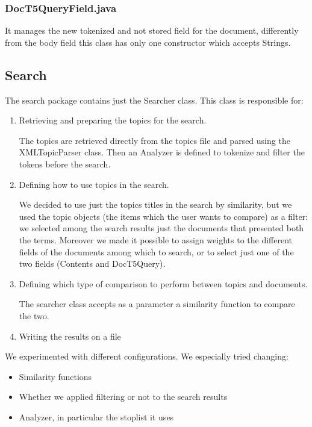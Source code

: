 \subsubsection{DocT5QueryField.java}
    
        It manages the new tokenized and not stored field for the document, differently from the body field this class has only one constructor which accepts Strings.
\subsection{Search}
  
  The search package contains just the Searcher class. This class is responsible for:
    \begin{enumerate}
    	\item Retrieving and preparing the topics for the search.
    	
    	The topics are retrieved directly from the topics file and parsed using the XMLTopicParser class.
    	Then an Analyzer is defined to tokenize and filter the tokens before the search.
    	\item Defining how to use topics in the search.
    	
    	We decided to use just the topics titles in the search by similarity, but we used the topic objects (the items which the user wants to compare) as a filter: we selected among the search results just the documents that presented both the terms.
    	Moreover we made it possible to assign weights to the different fields of the documents among which to search, or to select just one of the two fields (Contents and DocT5Query).
    	\item Defining which type of comparison to perform between topics and documents.
    	
    	The searcher class accepts as a parameter a similarity function to compare the two.
    	\item Writing the results on a file
    \end{enumerate}

    We experimented with different configurations. We especially tried changing:
    \begin{itemize}
    	\item Similarity functions
    	\item Whether we applied filtering or not to the search results
    	\item Analyzer, in particular the stoplist it uses
    \end{itemize}
